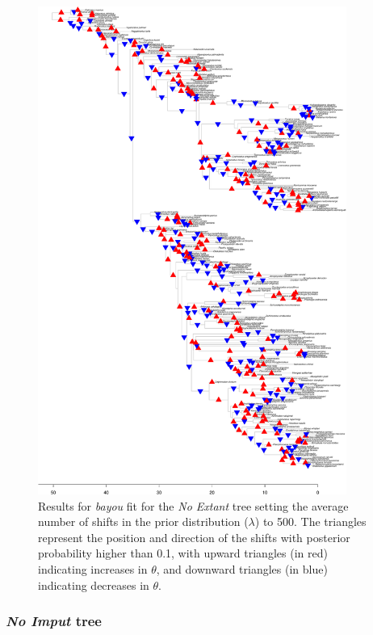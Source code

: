 \begin{figure}[H]
\includegraphics[width=0.9\textwidth]{img/plots-noextant-wZBL-k500-1.pdf}
\caption{Results for \textit{bayou} fit for the \textit{No Extant} tree setting the average number of shifts in the prior distribution ($\lambda$) to 500. The triangles represent the position and direction of the shifts with posterior probability higher than 0.1, with upward triangles (in red) indicating increases in $\theta$, and downward triangles (in blue) indicating decreases in $\theta$.}
\label{fig:noextant-k500}
\end{figure}

\subsubsection{\textit{No Imput} tree}

